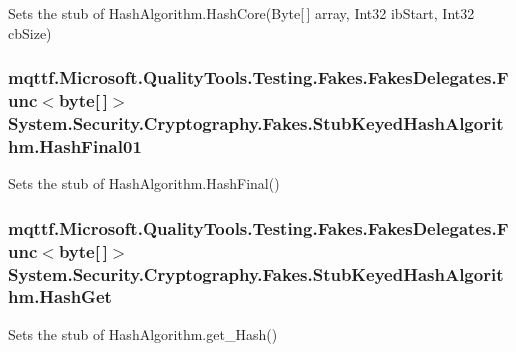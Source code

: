 Sets the stub of Hash\-Algorithm.\-Hash\-Core(\-Byte\mbox{[}$\,$\mbox{]} array, Int32 ib\-Start, Int32 cb\-Size)

\hypertarget{class_system_1_1_security_1_1_cryptography_1_1_fakes_1_1_stub_keyed_hash_algorithm_aea58e16072d06492ed690c2b5efc70b1}{
\subsubsection[{Hash\-Final01}]{\setlength{\rightskip}{0pt plus 5cm}mqttf.\-Microsoft.\-Quality\-Tools.\-Testing.\-Fakes.\-Fakes\-Delegates.\-Func$<$byte\mbox{[}$\,$\mbox{]}$>$ System.\-Security.\-Cryptography.\-Fakes.\-Stub\-Keyed\-Hash\-Algorithm.\-Hash\-Final01}}\label{class_system_1_1_security_1_1_cryptography_1_1_fakes_1_1_stub_keyed_hash_algorithm_aea58e16072d06492ed690c2b5efc70b1}


Sets the stub of Hash\-Algorithm.\-Hash\-Final()

\hypertarget{class_system_1_1_security_1_1_cryptography_1_1_fakes_1_1_stub_keyed_hash_algorithm_a6bab83439e25ed8d196cf01848f3dc0e}{
\subsubsection[{Hash\-Get}]{\setlength{\rightskip}{0pt plus 5cm}mqttf.\-Microsoft.\-Quality\-Tools.\-Testing.\-Fakes.\-Fakes\-Delegates.\-Func$<$byte\mbox{[}$\,$\mbox{]}$>$ System.\-Security.\-Cryptography.\-Fakes.\-Stub\-Keyed\-Hash\-Algorithm.\-Hash\-Get}}\label{class_system_1_1_security_1_1_cryptography_1_1_fakes_1_1_stub_keyed_hash_algorithm_a6bab83439e25ed8d196cf01848f3dc0e}


Sets the stub of Hash\-Algorithm.\-get\-\_\-\-Hash()

